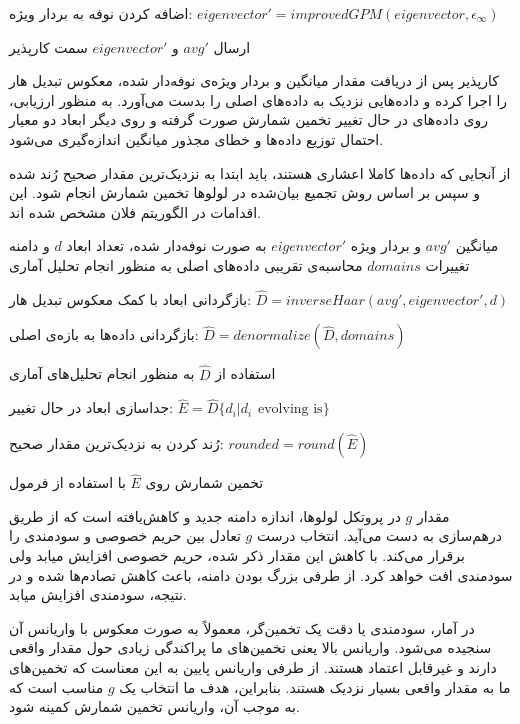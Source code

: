  اضافه کردن نوفه به بردار ویژه: $eigenvector' = improvedGPM(eigenvector, \epsilon_\infty)$

 ارسال $avg'$ و $eigenvector'$ سمت کارپذیر



کارپذیر پس از دریافت مقدار میانگین و بردار ویژه‌ی نوفه‌‌دار شده، معکوس تبدیل هار را اجرا کرده و داده‌هایی نزدیک به داده‌های اصلی را بدست می‌آورد. به منظور ارزیابی، روی داده‌های در حال تغییر تخمین شمارش صورت گرفته و روی دیگر ابعاد دو معیار احتمال توزیع داده‌ها و خطای مجذور میانگین اندازه‌گیری می‌شود.

از آنجایی که داده‌ها کاملا اعشاری هستند، باید ابتدا به نزدیک‌ترین مقدار صحیح رُند شده و سپس بر اساس روش تجمیع بیان‌شده در لولوها تخمین شمارش انجام شود. این اقدامات در الگوریتم فلان مشخص شده اند.


 میانگین $avg'$ و بردار ویژه $eigenvector'$ به صورت نوفه‌دار شده، تعداد ابعاد $d$ و دامنه تغییرات $domains$
 محاسبه‌ی تقریبی داده‌های اصلی به منظور انجام تحلیل آماری

 بازگردانی ابعاد با کمک معکوس تبدیل هار: $\hat{D} = inverseHaar(avg', eigenvector', d)$

 بازگردانی داده‌ها به بازه‌ی اصلی: $\hat{D} = denormalize(\hat{D}, domains)$

 استفاده از $\hat{D}$ به منظور انجام تحلیل‌های آماری

 جداسازی ابعاد در حال تغییر: $\hat{E} = \hat{D}\{d_i | d_i \hspace{5pt} \text{evolving is}\}$

 رُند کردن به نزدیک‌ترین مقدار صحیح: $rounded = round(\hat{E})$

 تخمین شمارش روی $\hat{E}$ با استفاده از فرمول 



مقدار $g$ در پروتکل لولوها، اندازه دامنه جدید و کاهش‌یافته است که از طریق درهم‌سازی به دست می‌آید. انتخاب درست $g$ تعادل بین حریم خصوصی و سودمندی را برقرار می‌کند. با کاهش این مقدار ذکر شده، حریم خصوصی افزایش میابد ولی سودمندی افت خواهد کرد. از طرفی بزرگ بودن دامنه، باعث کاهش تصادم‌ها شده و در نتیجه، سودمندی افزایش میابد.

در آمار، سودمندی یا دقت یک تخمین‌گر، معمولاً به صورت معکوس با واریانس آن سنجیده می‌شود. واریانس بالا یعنی تخمین‌های ما پراکندگی زیادی حول مقدار واقعی دارند و غیرقابل اعتماد هستند. از طرفی واریانس پایین به این معناست که تخمین‌های ما به مقدار واقعی بسیار نزدیک هستند. بنابراین، هدف ما انتخاب یک $g$ مناسب است که به موجب آن، واریانس تخمین شمارش کمینه شود.


